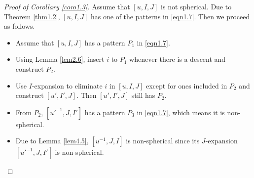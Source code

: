 \documentclass[12pt]{amsart}
\theoremstyle{definition}
\theoremstyle{remark}
\begin{document}
\begin{proof}[Proof of Corollary \ref{coro1.3}]
Assume that $[u,I,J]$ is not spherical. Due to Theorem \ref{thm1.2}, $[u,I,J]$ has one of the patterns in \eqref{eqn1.7}. Then we proceed as follows.

\begin{itemize}
\item[\textit{(Step 1)}] Assume that $[u,I,J]$ has a pattern $P_1$ in \eqref{eqn1.7}.
\item[\textit{(Step 2)}] Using Lemma \ref{lem2.6}, insert $i$ to $P_1$ whenever there is a descent and construct $P_2$.
\item[\textit{(Step 3)}] Use $I$-expansion to eliminate $i$ in $[u,I,J]$ except for ones included in $P_2$ and construct $[u',I',J]$. Then $[u',I',J]$ still has $P_2$.
\item[\textit{(Step 4)}] From $P_2$, $[u'^{-1} , J , I']$ has a pattern $P_3$ in \eqref{eqn1.7}, which means it is non-spherical.
\item[\textit{(Step 5)}] Due to Lemma \ref{lem4.5}, $[u^{-1}, J , I]$ is non-spherical since its $J$-expansion  $[u'^{-1} , J , I']$ is non-spherical.
\end{itemize}


\end{proof}
\end{document}
